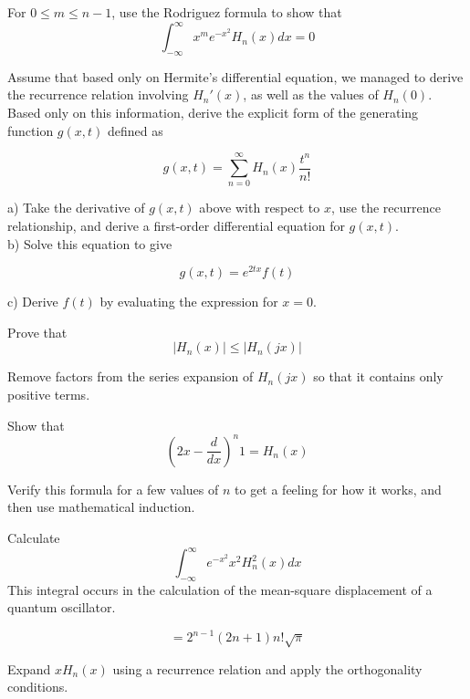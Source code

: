 \pagebreak

\begin{exer}
For $0 \leq m \leq n-1$, use the Rodriguez formula to show that 
$$\int_{-\infty}^{\infty}x^m e^{-x^2} H_n(x) dx = 0$$
\end{exer}


\begin{exer}
Assume that based only on Hermite's differential equation, we managed to derive the recurrence relation involving $H_n'(x)$, as well as the values of $H_n(0)$. Based only on this information, derive the explicit form of the generating function $g(x,t)$ defined as

$$g(x,t) = \sum_{n = 0}^{\infty} H_n(x)\frac{t^n}{n!} $$

a) Take the derivative of $g(x,t)$ above with respect to $x$, use the recurrence relationship, and derive a first-order differential equation for $g(x,t)$.\\

b) Solve this equation to give

$$g(x,t) = e^{2tx} f(t)$$

c) Derive $f(t)$ by evaluating the expression for $x=0$.
\end{exer}

\begin{exer}
Prove that 
$$ | H_n(x) | \le  | H_n(jx) | $$
\begin{hnt}
  Remove factors from the series expansion of $ H_n(jx) $ so that it contains only positive terms.
\end{hnt}
\end{exer}


\begin{exer}
Show that 
$$\left( 2x - \frac{d}{dx} \right)^n 1 = H_n(x)$$
\begin{hnt}
  Verify this formula for a few values of $n$ to get a feeling for how it works, and then use mathematical induction.
\end{hnt}
\end{exer}


\begin{exer}
Calculate
$$ \int_{-\infty}^{\infty} e^{-x^2} x^2 H_n^2(x) dx $$
This integral occurs in the calculation of the mean-square displacement of a quantum oscillator.
\begin{sol}
$$ = 2^{n-1} (2n + 1) n! \sqrt{\pi}$$
\end{sol}
\begin{hnt}
Expand $x H_n(x)$ using a recurrence relation and apply the orthogonality conditions.
\end{hnt}  
\end{exer}

